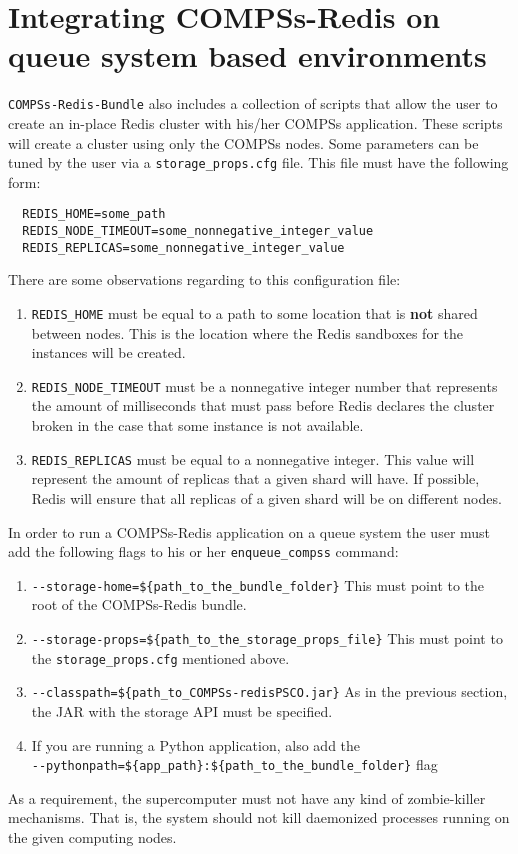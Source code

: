 \documentclass{article}
\begin{document}
  \section{Integrating COMPSs-Redis on queue system based environments}
  \verb|COMPSs-Redis-Bundle| also includes a collection of scripts that allow the user to create an in-place Redis cluster with his/her COMPSs application. These scripts will create a cluster using only the COMPSs nodes. Some parameters can be tuned by the user via a \verb|storage_props.cfg| file. This file must have the following form:
  \begin{verbatim}
  REDIS_HOME=some_path
  REDIS_NODE_TIMEOUT=some_nonnegative_integer_value
  REDIS_REPLICAS=some_nonnegative_integer_value
  \end{verbatim}
  There are some observations regarding to this configuration file:
  \begin{enumerate}
  \item \verb|REDIS_HOME| must be equal to a path to some location that is \textbf{not} shared between nodes. This is the location where the Redis sandboxes for the instances will be created.
  \item \verb|REDIS_NODE_TIMEOUT| must be a nonnegative integer number that represents the amount of milliseconds that must pass before Redis declares the cluster broken in the case that some instance is not available.
  \item \verb|REDIS_REPLICAS| must be equal to a nonnegative integer. This value will represent the amount of replicas that a given shard will have. If possible, Redis will ensure that all replicas of a given shard will be on different nodes. 
  \end{enumerate}
  In order to run a COMPSs-Redis application on a queue system the user must add the following flags to his or her \verb|enqueue_compss| command:
  \begin{enumerate}
  \item \verb|--storage-home=${path_to_the_bundle_folder}| This must point to the root of the COMPSs-Redis bundle.
  \item \verb|--storage-props=${path_to_the_storage_props_file}| This must point to the \verb|storage_props.cfg| mentioned above.
  \item \verb|--classpath=${path_to_COMPSs-redisPSCO.jar}| As in the previous section, the JAR with the storage API must be specified.
  \item If you are running a Python application, also add the \\ \verb|--pythonpath=${app_path}:${path_to_the_bundle_folder}| flag
  \end{enumerate}
  As a requirement, the supercomputer must not have any kind of zombie-killer mechanisms. That is, the system should not kill daemonized processes running on the given computing nodes.
  
\end{document}
